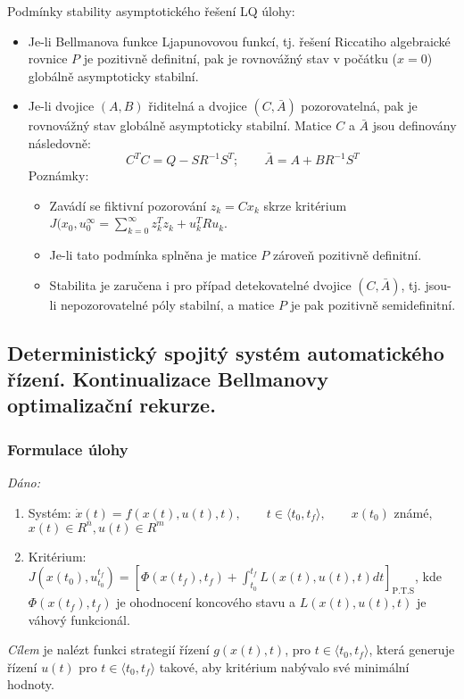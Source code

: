 Podmínky stability asymptotického řešení LQ úlohy:
\begin{itemize}
\item Je-li Bellmanova funkce Ljapunovovou funkcí, tj. řešení Riccatiho algebraické rovnice $ P $ je pozitivně definitní, pak je rovnovážný stav v počátku ($ x = 0 $) globálně asymptoticky stabilní.
\item Je-li dvojice $ (A, B) $ řiditelná a dvojice $ (C, \bar{A}) $ pozorovatelná, pak je rovnovážný stav globálně asymptoticky stabilní. Matice $ C $ a  $ \bar{A} $ jsou definovány následovně:
\begin{equation*}
C^TC = Q - SR^{-1}S^T; \qquad \bar{A} = A + BR^{-1}S^T
\end{equation*}
Poznámky:
\begin{itemize}
\item Zavádí se fiktivní pozorování $ z_k = Cx_k $ skrze kritérium $ J(x_0, u_0^\infty = \displaystyle{\sum_{k=0}^\infty} z_k^T z_k + u_k^T R u_k $.
\item Je-li tato podmínka splněna je matice $ P $ zároveň pozitivně definitní.
\item Stabilita je zaručena i pro případ detekovatelné dvojice $ (C, \bar{A}) $, tj. jsou-li nepozorovatelné póly stabilní, a matice $ P $ je pak pozitivně semidefinitní.
\end{itemize}
\end{itemize}

\subsection{Deterministický spojitý systém automatického řízení. Kontinualizace Bellmanovy optimalizační rekurze.}
\subsubsection*{Formulace úlohy}
\textit{Dáno:}
\begin{enumerate}
\item Systém: $ \dot{x}(t) = f(x(t), u(t), t), \qquad t \in \langle t_0, t_f \rangle, \qquad x(t_0) $ známé, $ x(t) \in R^n, u(t) \in R^m $
\item Kritérium: $ J(x(t_0), u_{t_0}^{t_f}) = \left[ \Phi(x(t_f), t_f) + \displaystyle{\int_{t_0}^{t_f}} L(x(t), u(t), t) dt \right]_{\mathrm{P.T.S}} $, kde $ \Phi(x(t_f), t_f) $ je ohodnocení koncového stavu a $ L(x(t), u(t), t) $ je váhový funkcionál.
\end{enumerate}
\textit{Cílem} je nalézt funkci strategií řízení $ g(x(t), t) $, pro $ t \in \langle t_0, t_f \rangle $, která generuje řízení $ u(t) $ pro $ t \in \langle t_0, t_f \rangle $ takové, aby kritérium nabývalo své minimální hodnoty.

